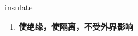 
\begin{frame}
{\huge insulate}
\begin{center}
\begin{enumerate}\Large
  \item \textbf{使绝缘，使隔离，不受外界影响}
\end{enumerate}
\end{center}
\end{frame}
